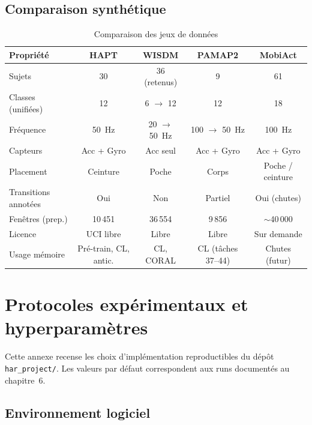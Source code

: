 \documentclass[a4paper,12pt]{report}
\begin{document}
\section{Comparaison synthétique}

\begin{table}[H]
\centering
\small
\begin{tabularx}{\textwidth}{|Y|c|c|c|c|}
\hline
\textbf{Propriété} & \textbf{HAPT} & \textbf{WISDM} & \textbf{PAMAP2} & \textbf{MobiAct} \\
\hline
Sujets & 30 & 36 (retenus) & 9 & 61 \\
Classes (unifiées) & 12 & 6 $\rightarrow$ 12 & 12 & 18 \\
Fréquence & 50~Hz & 20 $\rightarrow$ 50~Hz & 100 $\rightarrow$ 50~Hz & 100~Hz \\
Capteurs & Acc + Gyro & Acc seul & Acc + Gyro & Acc + Gyro \\
Placement & Ceinture & Poche & Corps & Poche / ceinture \\
Transitions annotées & Oui & Non & Partiel & Oui (chutes) \\
Fenêtres (prep.) & 10\,451 & 36\,554 & 9\,856 & $\sim$40\,000 \\
Licence & UCI libre & Libre & Libre & Sur demande \\
Usage mémoire & Pré-train, CL, antic. & CL, CORAL & CL (tâches 37--44) & Chutes (futur) \\
\hline
\end{tabularx}
\caption{Comparaison des jeux de données}
\label{tab:annexe_compare}
\end{table}

\FloatBarrier



\chapter{Protocoles expérimentaux et hyperparamètres}
\label{app:protocol}

Cette annexe recense les choix d'implémentation reproductibles du dépôt
\texttt{har\_project/}. Les valeurs par défaut correspondent aux runs
documentés au chapitre~6.

\section{Environnement logiciel}
\end{document}
